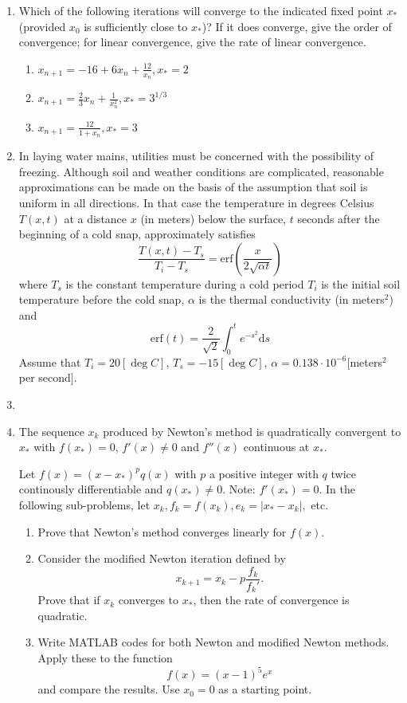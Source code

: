 \documentclass[a4paper,12pt]{article}
\newcommand{\abs}[1]{\left| #1 \right|}
\newcommand{\erf}{\mathrm{erf}}
\newcommand{\dd}{\mathrm{d}}
\begin{document}
	\begin{enumerate}[label = \arabic*.]
		\item Which of the following iterations will converge to the indicated fixed point $ x_* $ (provided $ x_0 $ is sufficiently close to $ x_* $)? If it does converge, give the order of convergence; for linear convergence, give the rate of linear convergence.
		
		\begin{enumerate}[label = \roman*.]
			\item $ x_{n+1} = -16 + 6x_n + \frac{12}{x_n}, x_*= 2$
			
			\item $ x_{n+1} = \frac{2}{3} x_n + \frac{1}{x_n^2}, x_* = 3^{1/3}$
			
			\item $ x_{n+1} = \frac{12}{1+x_n}, x_* = 3 $
		\end{enumerate}
	
		\item In laying water mains, utilities must be concerned with the possibility of freezing. Although soil and weather conditions are complicated, reasonable approximations can be made on the basis of the assumption that soil is uniform in all directions.  In that case the temperature in degrees Celsius $ T(x,t) $ at a distance $ x $ (in meters) below the surface, $ t $ seconds after the beginning of a cold snap, approximately satisfies
		\[
			\frac{T(x,t) - T_s}{T_i - T_s} = \erf\left(\frac{x}{2\sqrt{\alpha t}}\right)
		\]
		where $ T_s $ is the constant temperature during a cold period $ T_i $ is the initial soil temperature before the cold snap, $ \alpha $ is the thermal conductivity (in meters$ ^2 $) and 
		\[
			\erf(t) = \frac{2}{\sqrt{2}} \int_0^t e^{-s^2}\dd s
		\]
		Assume that $ T_i = 20 [\deg C]$, $ T_s = -15 [\deg C] $, $ \alpha = 0.138 \cdot 10^{-6} [$meters$ ^2 $ per second$ ] .$
		\item
		\item The sequence $ x_k $ produced by Newton's method is quadratically convergent to $ x_* $ with $ f(x_*) = 0 $, $ f'(x) \neq 0 $ and $ f''(x) $ continuous at $ x_* $.
		
		Let $ f(x) = (x-x_*)^p q(x) $ with $ p $ a positive integer with $ q $ twice continously differentiable and $ q(x_*) \neq 0 $. Note: $ f'(x_*) = 0. $ In the following sub-problems, let $ x_k, f_k = f(x_k), e_k = \abs{x_* - x_k}, $ etc.
		
		\begin{enumerate}[label = \roman*.]
			\item Prove that Newton's method converges linearly for $ f(x). $
			
			\item Consider the modified Newton iteration defined by 
			\[
				x_{k+1} = x_k - p \frac{f_k}{f_k'}.
			\]
			Prove that if $ x_k $ converges to $ x_* $, then the rate of convergence is quadratic.
				
			\item Write MATLAB codes for both Newton and modified Newton methods. Apply these to the function
			\[
				f(x) = (x-1)^5 e^x
			\]
			and compare the results. Use $ x_0 = 0 $ as a starting point.
		\end{enumerate}
	\end{enumerate}
\end{document}
